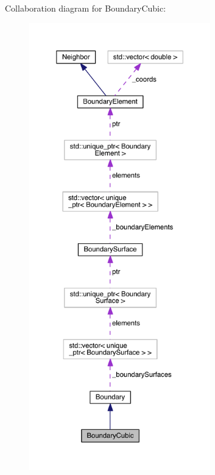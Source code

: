 Collaboration diagram for Boundary\+Cubic\+:
\nopagebreak
\begin{figure}[H]
\begin{center}
\leavevmode
\includegraphics[height=550pt]{classBoundaryCubic__coll__graph}
\end{center}
\end{figure}
